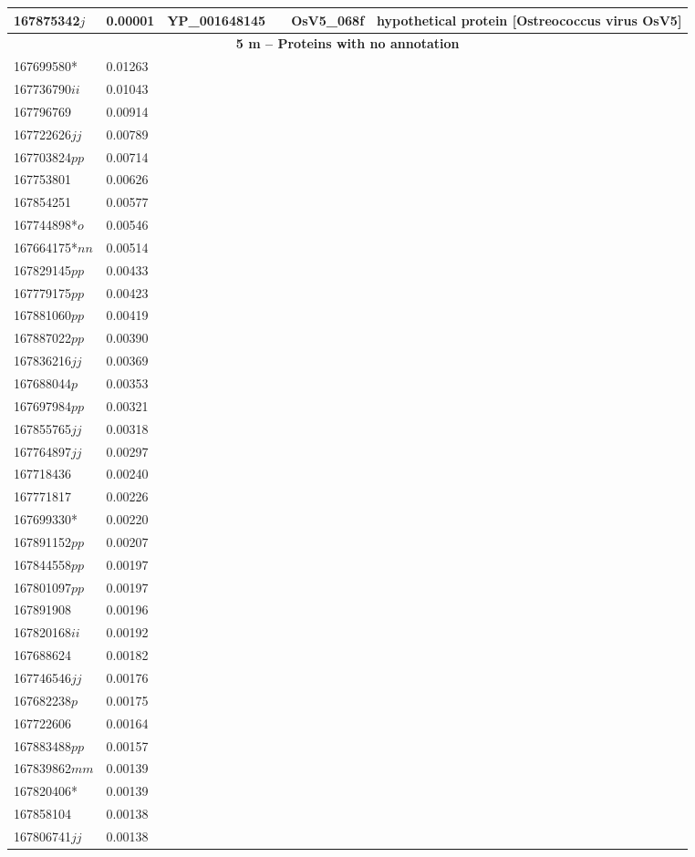 \begin{landscape}
\begin{longtable}{p{1.8cm}p{0.9cm}p{2.2cm}p{1cm}p{2.8cm}p{13.4cm}}
167875342$j$&0.00001&YP\_001648145&&OsV5\_068f&hypothetical protein [Ostreococcus virus OsV5] \\
\toprule
\multicolumn{6}{c}{\textbf{5 m -- Proteins with no annotation}}  \\
\midrule
167699580*&0.01263&&&& \\
167736790$ii$&0.01043&&&& \\
167796769&0.00914&&&& \\
167722626$jj$&0.00789&&&& \\
167703824$pp$&0.00714&&&& \\
167753801&0.00626&&&& \\
167854251&0.00577&&&& \\
167744898*$o$&0.00546&&&& \\
167664175*$nn$&0.00514&&&& \\
167829145$pp$&0.00433&&&& \\
167779175$pp$&0.00423&&&& \\
167881060$pp$&0.00419&&&& \\
167887022$pp$&0.00390&&&& \\
167836216$jj$&0.00369&&&& \\
167688044$p$&0.00353&&&& \\
167697984$pp$&0.00321&&&& \\
167855765$jj$&0.00318&&&& \\
167764897$jj$&0.00297&&&& \\
167718436&0.00240&&&& \\
167771817&0.00226&&&& \\
167699330*&0.00220&&&& \\
167891152$pp$&0.00207&&&& \\
167844558$pp$&0.00197&&&& \\
167801097$pp$&0.00197&&&& \\
167891908&0.00196&&&& \\
167820168$ii$&0.00192&&&& \\
167688624&0.00182&&&& \\
167746546$jj$&0.00176&&&& \\
167682238$p$&0.00175&&&& \\
167722606&0.00164&&&& \\
167883488$pp$&0.00157&&&& \\
167839862$mm$&0.00139&&&& \\
167820406*&0.00139&&&& \\
167858104&0.00138&&&& \\
167806741$jj$&0.00138&&&& \\

\end{longtable}
\end{landscape}

